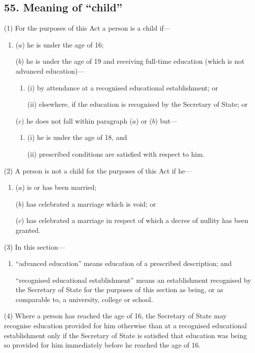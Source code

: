 \documentclass[12pt,a4paper]{article}
\begin{document}
\subsection{55. Meaning of “child”}

(1) For the purposes of this Act a person is a child if—
\begin{enumerate}\item[]
($a$) he is under the age of 16;

($b$) he is under the age of 19 and receiving full-time education (which is not advanced education)—
\begin{enumerate}\item[]
(i) by attendance at a recognised educational establishment; or

(ii) elsewhere, if the education is recognised by the Secretary of State; or
\end{enumerate}

($c$) he does not fall within paragraph ($a$)  or ($b$)  but—
\begin{enumerate}\item[]
(i) he is under the age of 18, and

(ii) prescribed conditions are satisfied with respect to him.
\end{enumerate}
\end{enumerate}

(2) A person is not a child for the purposes of this Act if he—
\begin{enumerate}\item[]
($a$) is or has been married;

($b$) has celebrated a marriage which is void; or

($c$) has celebrated a marriage in respect of which a decree of nullity has been granted.
\end{enumerate}

(3) In this section—
\begin{enumerate}\item[]
    “advanced education” means education of a prescribed description; and

    “recognised educational establishment” means an establishment recognised by the Secretary of State for the purposes of this section as being, or as comparable to, a university, college or school. 
\end{enumerate}

(4) Where a person has reached the age of 16, the Secretary of State may recognise education provided for him otherwise than at a recognised educational establishment only if the Secretary of State is satisfied that education was being so provided for him immediately before he reached the age of 16.
\end{document}
